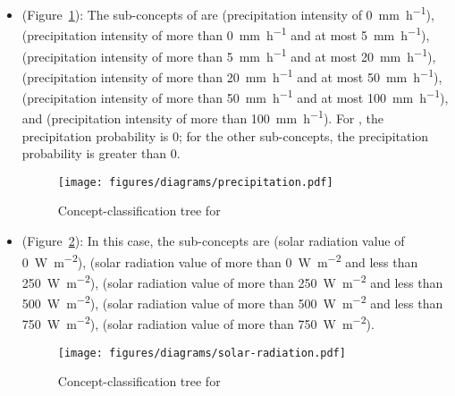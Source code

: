 \begin{itemize}
  \item {} (Figure~\ref{fig:tree_precipitation}): The sub-concepts of  are  (precipitation intensity of \SI{0}{\milli\metre\per\hour}),  (precipitation intensity of more than \SI{0}{\milli\metre\per\hour} and at most \SI{5}{\milli\metre\per\hour}),  (precipitation intensity of more than \SI{5}{\milli\metre\per\hour} and at most \SI{20}{\milli\metre\per\hour}),  (precipitation intensity of more than \SI{20}{\milli\metre\per\hour} and at most \SI{50}{\milli\metre\per\hour}),  (precipitation intensity of more than \SI{50}{\milli\metre\per\hour} and at most \SI{100}{\milli\metre\per\hour}), and  (precipitation intensity of more than \SI{100}{\milli\metre\per\hour}). For , the precipitation probability is \num{0}; for the other sub-concepts, the precipitation probability is greater than \num{0}.
  
  \begin{figure}
    \centering
    \texttt{[image: figures/diagrams/precipitation.pdf]}
    \caption{Concept-classification tree for }
    \label{fig:tree_precipitation}
  \end{figure}
  
  \item {} (Figure~\ref{fig:tree_solar_radiation}): In this case, the sub-concepts are  (solar radiation value of \SI{0}{\watt\per\square\meter}),  (solar radiation value of more than \SI{0}{\watt\per\square\meter} and less than \SI{250}{\watt\per\square\meter}),  (solar radiation value of more than \SI{250}{\watt\per\square\meter} and less than \SI{500}{\watt\per\square\meter}),  (solar radiation value of more than \SI{500}{\watt\per\square\meter} and less than \SI{750}{\watt\per\square\meter}),  (solar radiation value of more than \SI{750}{\watt\per\square\meter}).
  
  \begin{figure}
    \centering
    \texttt{[image: figures/diagrams/solar-radiation.pdf]}
    \caption{Concept-classification tree for }
    \label{fig:tree_solar_radiation}
  \end{figure}


\end{itemize}
